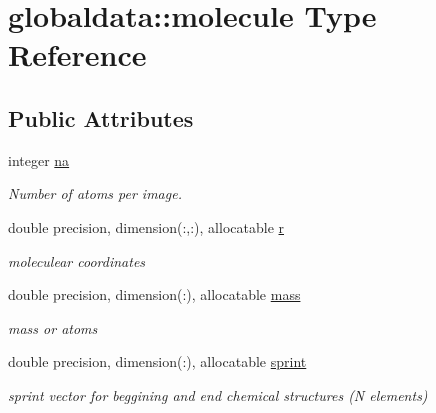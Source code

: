 \hypertarget{structglobaldata_1_1molecule}{}\section{globaldata\+:\+:molecule Type Reference}
\label{structglobaldata_1_1molecule}
\subsection*{Public Attributes}
\begin{DoxyCompactItemize}
\item 
\mbox{\label{structglobaldata_1_1molecule_a809c906416e595862da621f7d2b3a8b3}} 
integer \mbox{\hyperlink{structglobaldata_1_1molecule_a809c906416e595862da621f7d2b3a8b3}{na}}
\begin{DoxyCompactList}\small\item\em Number of atoms per image. \end{DoxyCompactList}\item 
\mbox{\label{structglobaldata_1_1molecule_ab801afaabbb167ef4cc622ce31cc92e0}} 
double precision, dimension(\+:,\+:), allocatable \mbox{\hyperlink{structglobaldata_1_1molecule_ab801afaabbb167ef4cc622ce31cc92e0}{r}}
\begin{DoxyCompactList}\small\item\em moleculear coordinates \end{DoxyCompactList}\item 
\mbox{\label{structglobaldata_1_1molecule_a8dc6c5a511fd50002a531e56dadf5677}} 
double precision, dimension(\+:), allocatable \mbox{\hyperlink{structglobaldata_1_1molecule_a8dc6c5a511fd50002a531e56dadf5677}{mass}}
\begin{DoxyCompactList}\small\item\em mass or atoms \end{DoxyCompactList}\item 
\mbox{\label{structglobaldata_1_1molecule_a1fdf6cacdf08ec8b67c42ee59453bc40}} 
double precision, dimension(\+:), allocatable \mbox{\hyperlink{structglobaldata_1_1molecule_a1fdf6cacdf08ec8b67c42ee59453bc40}{sprint}}
\begin{DoxyCompactList}\small\item\em sprint vector for beggining and end chemical structures (N elements) \end{DoxyCompactList}\item 

\end{DoxyCompactItemize}
